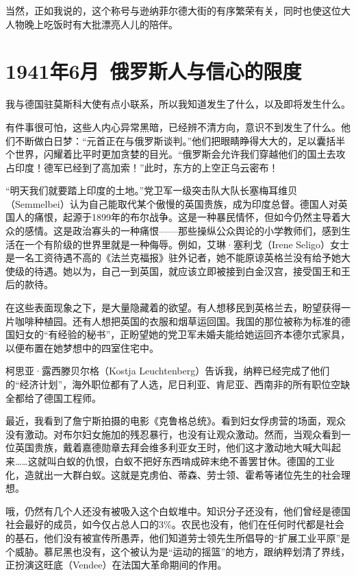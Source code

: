 \documentclass[UTF8]{ctexart}
\begin{document}
当然，正如我说的，这个称号与逊纳菲尔德大街的有序繁荣有关，同时也使这位大人物晚上吃饭时有大批漂亮人儿的陪伴。

\section{1941年6月\ 俄罗斯人与信心的限度}

我与德国驻莫斯科大使有点小联系，所以我知道发生了什么，以及即将发生什么。

有件事很可怕，这些人内心异常黑暗，已经辨不清方向，意识不到发生了什么。他们不断做白日梦：“元首正在与俄罗斯谈判。”他们把眼睛睁得大大的，足以囊括半个世界，闪耀着比平时更加贪婪的目光。“俄罗斯会允许我们穿越他们的国土去攻占印度！德军已经到了高加索！”此时，东方的上空正乌云密布！

“明天我们就要踏上印度的土地。”党卫军一级突击队大队长塞梅耳维贝（Semmelbei）认为自己能取代某个傲慢的英国贵族，成为印度总督。德国人对英国人的痛恨，起源于1899年的布尔战争。这是一种暴民情怀，但如今仍然主导着大众的感情。这是政治寡头的一种痛恨——那些操纵公众舆论的小学教师们，感到生活在一个有阶级的世界里就是一种侮辱。例如，艾琳·塞利戈（Irene Seligo）女士是一名工资待遇不高的《法兰克福报》驻外记者，她不能原谅英格兰没有给予她大使级的待遇。她以为，自己一到英国，就应该立即被接到白金汉宫，接受国王和王后的款待。

在这些表面现象之下，是大量隐藏着的欲望。有人想移民到英格兰去，盼望获得一片咖啡种植园。还有人想把英国的衣服和烟草运回国。我国的那位被称为标准的德国妇女的“有经验的秘书”，正盼望她的党卫军未婚夫能给她运回齐本德尔式家具，以便布置在她梦想中的四室住宅中。

柯思亚·露西滕贝尔格（Kostja Leuchtenberg）告诉我，纳粹已经完成了他们的“经济计划”，海外职位都有了人选，尼日利亚、肯尼亚、西南非的所有职位空缺全都给了德国工程师。

最近，我看到了詹宁斯拍摄的电影《克鲁格总统》。看到妇女俘虏营的场面，观众没有激动。对布尔妇女施加的残忍暴行，也没有让观众激动。然而，当观众看到一位英国贵族，戴着嘉德勋章去拜会维多利亚女王时，他们这才激动地大喊大叫起来……这就叫白蚁的仇恨，白蚁不把好东西啃成碎末绝不善罢甘休。德国的工业化，造就出一大群白蚁。这就是克虏伯、蒂森、劳士领、霍希等诸位先生的社会理想。

哦，仍然有几个人还没有被吸入这个白蚁堆中。知识分子还没有，他们曾经是德国社会最好的成员，如今仅占总人口的3\%。农民也没有，他们在任何时代都是社会的基石，他们没有被宣传所愚弄，他们知道劳士领先生所倡导的“扩展工业平原”是个威胁。慕尼黑也没有，这个被认为是“运动的摇篮”的地方，跟纳粹划清了界线，正扮演这旺底（Vendee）在法国大革命期间的作用。
\end{document}
